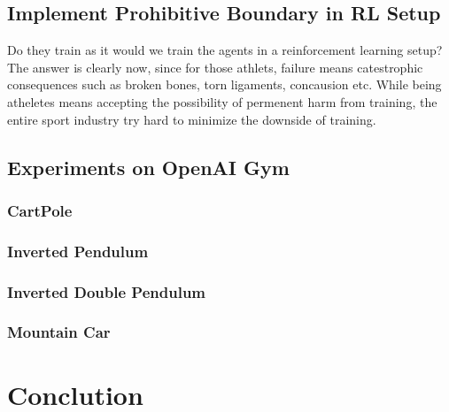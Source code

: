 \documentclass[journal]{IEEEtran}
\begin{document}
\subsection{Implement Prohibitive Boundary in RL Setup}



Do they train as it would we train the agents in a reinforcement learning setup? The answer is clearly now, since for those athlets, failure means catestrophic consequences such as broken bones, torn ligaments, concausion etc. While being atheletes means accepting the possibility of permenent harm from training, the entire sport industry try hard to minimize the downside of training.


\subsection{Experiments on OpenAI Gym}
\subsubsection{CartPole}
\subsubsection{Inverted Pendulum}
\subsubsection{Inverted Double Pendulum}
\subsubsection{Mountain Car}
\subsubsection{}


\section{Conclution}






\end{document}
